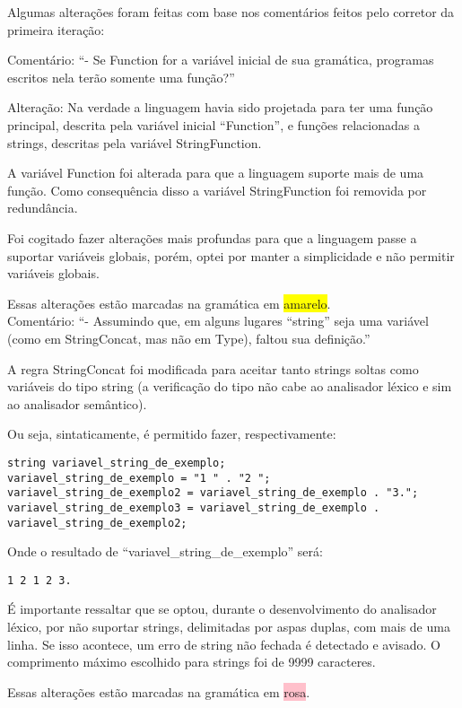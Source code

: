 \documentclass[12pt]{article}
\begin{document}
Algumas alterações foram feitas com base nos comentários feitos pelo corretor da primeira iteração:

Comentário: ``- Se Function for a variável inicial de sua gramática, programas escritos nela terão somente uma função?''

Alteração: Na verdade a linguagem havia sido projetada para ter uma função principal, descrita pela variável inicial ``Function'', e funções relacionadas a strings, descritas pela variável StringFunction.

A variável Function foi alterada para que a linguagem suporte mais de uma função. Como consequência disso a variável StringFunction foi removida por redundância.

Foi cogitado fazer alterações mais profundas para que a linguagem passe a suportar variáveis globais, porém, optei por manter a simplicidade e não permitir variáveis globais.

Essas alterações estão marcadas na gramática em \colorbox{yellow}{amarelo}.\\

Comentário: ``- Assumindo que, em alguns lugares ``string'' seja uma variável (como em StringConcat, mas não em Type), faltou sua definição.''

A regra StringConcat foi modificada para aceitar tanto strings soltas como variáveis do tipo string (a verificação do tipo não cabe ao analisador léxico e sim ao analisador semântico).

Ou seja, sintaticamente, é permitido fazer, respectivamente:
\begin{verbatim}
string variavel_string_de_exemplo;
variavel_string_de_exemplo = "1 " . "2 ";
variavel_string_de_exemplo2 = variavel_string_de_exemplo . "3.";
variavel_string_de_exemplo3 = variavel_string_de_exemplo . variavel_string_de_exemplo2;
\end{verbatim}
Onde o resultado de ``variavel\_string\_de\_exemplo'' será:
\begin{verbatim}
1 2 1 2 3.
\end{verbatim}

É importante ressaltar que se optou, durante o desenvolvimento do analisador léxico, por não suportar strings, delimitadas por aspas duplas, com mais de uma linha. Se isso acontece, um erro de string não fechada é detectado e avisado. O comprimento máximo escolhido para strings foi de 9999 caracteres.

Essas alterações estão marcadas na gramática em \colorbox{pink}{rosa}.\\
\end{document}
